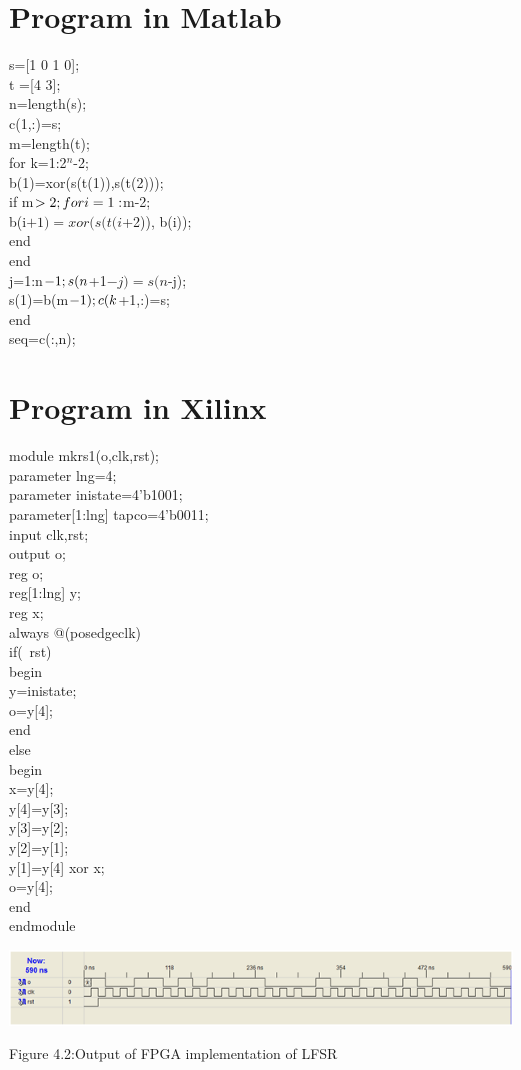 \documentclass[a4paper]{report}
\begin{document}
\section{Program in Matlab }
\large\textnormal{s=[1 0 1 0];\\
t =[4 3];\\
n=length(s);\\
c(1,:)=s;\\
m=length(t);\\
for k=1:2$^n$-2;\\
b(1)=xor(s(t(1)),s(t(2)));\\
if m$>2;\\
    for i=1:$m-2;\\
    b(i$+1)=xor(s(t(i$+2)), b(i));\\
    end\\
end\\
j=1:n$-1;\\
s(n$+1$-j)=s(n$-j);\\
s(1)=b(m$-1);\\
c(k$+1,:)=s;\\
end\\
seq=c(:,n);}
\section{Program in Xilinx}
\large\textnormal{module mkrs1(o,clk,rst);\\
parameter lng=4;\\
parameter inistate=4'b1001;\\
parameter[1:lng] tapco=4'b0011;\\
input clk,rst;\\
output o;\\
reg o;\\
reg[1:lng] y;\\
reg x;\\
always @(posedgeclk)\\
if(~rst)\\
begin\\
y=inistate;\\
o=y[4];\\
end\\
else\\
begin\\
x=y[4];\\
y[4]=y[3];\\
y[3]=y[2];\\
y[2]=y[1];\\
y[1]=y[4] xor x;\\
o=y[4];\\
end\\
endmodule}


\begin{center}
\includegraphics[width=15.0cm]{lfsro.png}\\[0.75cm]
\end{center}
\begin{center}
\small\textnormal{Figure 4.2:Output of FPGA implementation of LFSR}
\end{center}
\end{document}
